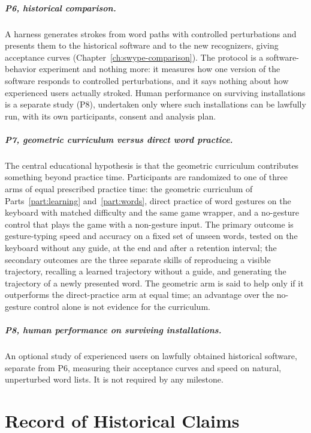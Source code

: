 \paragraph{P6, historical comparison.} A harness generates strokes from word paths with controlled perturbations and presents them to the historical software and to the new recognizers, giving acceptance curves (Chapter~\ref{ch:swype-comparison}). The protocol is a software-behavior experiment and nothing more: it measures how one version of the software responds to controlled perturbations, and it says nothing about how experienced users actually stroked. Human performance on surviving installations is a separate study (P8), undertaken only where such installations can be lawfully run, with its own participants, consent and analysis plan.

\paragraph{P7, geometric curriculum versus direct word practice.} The central educational hypothesis is that the geometric curriculum contributes something beyond practice time. Participants are randomized to one of three arms of equal prescribed practice time: the geometric curriculum of Parts~\ref{part:learning} and~\ref{part:words}, direct practice of word gestures on the keyboard with matched difficulty and the same game wrapper, and a no-gesture control that plays the game with a non-gesture input. The primary outcome is gesture-typing speed and accuracy on a fixed set of unseen words, tested on the keyboard without any guide, at the end and after a retention interval; the secondary outcomes are the three separate skills of reproducing a visible trajectory, recalling a learned trajectory without a guide, and generating the trajectory of a newly presented word. The geometric arm is said to help only if it outperforms the direct-practice arm at equal time; an advantage over the no-gesture control alone is not evidence for the curriculum.

\paragraph{P8, human performance on surviving installations.} An optional study of experienced users on lawfully obtained historical software, separate from P6, measuring their acceptance curves and speed on natural, unperturbed word lists. It is not required by any milestone.

\chapter{Record of Historical Claims}\label{app:swype-record}

